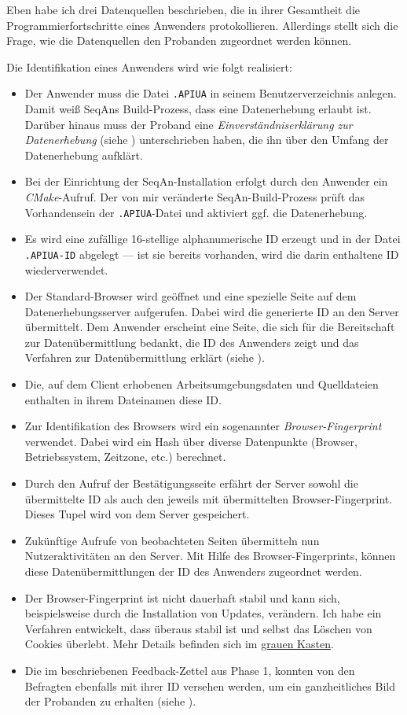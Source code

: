 Eben habe ich drei Datenquellen beschrieben, die in ihrer Gesamtheit die Programmierfortschritte eines Anwenders protokollieren. Allerdings stellt sich die Frage, wie die Datenquellen den Probanden zugeordnet werden können.

Die Identifikation eines Anwenders wird wie folgt realisiert:
\begin{itemize}
  \item Der Anwender muss die Datei \texttt{.APIUA} in seinem Benutzerverzeichnis anlegen. Damit weiß SeqAns Build-Prozess, dass eine Datenerhebung erlaubt ist. Darüber hinaus muss der Proband eine \textit{Einverständniserklärung zur Datenerhebung} (siehe ) unterschrieben haben, die ihn über den Umfang der Datenerhebung aufklärt.
  \item Bei der Einrichtung der SeqAn-Installation erfolgt durch den Anwender ein \textit{CMake}-Aufruf. Der von mir veränderte SeqAn-Build-Prozess prüft das Vorhandensein der \texttt{.APIUA}-Datei und aktiviert ggf. die Datenerhebung.
  \item Es wird eine zufällige 16-stellige alphanumerische ID erzeugt und in der Datei \texttt{.APIUA-ID} abgelegt --- ist sie bereits vorhanden, wird die darin enthaltene ID wiederverwendet.
  \item Der Standard-Browser wird geöffnet und eine spezielle Seite auf dem Datenerhebungsserver aufgerufen. Dabei wird die generierte ID an den Server übermittelt. Dem Anwender erscheint eine Seite, die sich für die Bereitschaft zur Datenübermittlung bedankt, die ID des Anwenders zeigt und das Verfahren zur Datenübermittlung erklärt (siehe ).
  \item Die, auf dem Client erhobenen Arbeitsumgebungsdaten und Quelldateien enthalten in ihrem Dateinamen diese ID.
  \item Zur Identifikation des Browsers wird ein sogenannter \textit{Browser-Fingerprint} verwendet. Dabei wird ein Hash über diverse Datenpunkte (Browser, Betriebssystem, Zeitzone, etc.) berechnet.
  \item Durch den Aufruf der Bestätigungsseite erfährt der Server sowohl die übermittelte ID als auch den jeweils mit übermittelten Browser-Fingerprint. Dieses Tupel wird von dem Server gespeichert.
  \item Zukünftige Aufrufe von beobachteten Seiten übermitteln nun Nutzeraktivitäten an den Server. Mit Hilfe des Browser-Fingerprints, können diese Datenübermittlungen der ID des Anwenders zugeordnet werden.
  \item Der Browser-Fingerprint ist nicht dauerhaft stabil und kann sich, beispielsweise durch die Installation von Updates, verändern. Ich habe ein Verfahren entwickelt, dass überaus stabil ist und selbst das Löschen von Cookies überlebt. Mehr Details befinden sich im \hyperref[subsec:browser-fingerprint]{grauen Kasten}.
  \item Die im  beschriebenen Feedback-Zettel aus Phase 1, konnten von den Befragten ebenfalls mit ihrer ID versehen werden, um ein ganzheitliches Bild der Probanden zu erhalten (siehe ).
\end{itemize}

